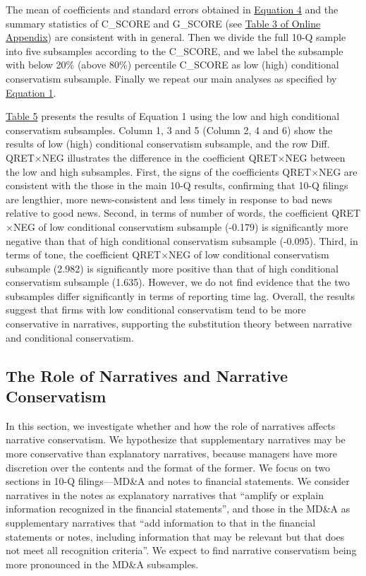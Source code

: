 \documentclass[a4paper]{article}
\begin{document}
\begin{spacing}{2}
The mean of coefficients and standard errors obtained in \hyperref[eq4]{Equation 4} and the summary statistics of C\_SCORE and G\_SCORE (see \hyperref[oat3]{Table 3 of Online Appendix}) are consistent with  in general. Then we divide the full 10-Q sample into five subsamples according to the C\_SCORE, and we label the subsample with below 20\% (above 80\%) percentile C\_SCORE as low (high) conditional conservatism subsample. Finally we repeat our main analyses as specified by \hyperref[eq1]{Equation 1}.

\hyperref[T5]{Table 5} presents the results of Equation 1 using the low and high conditional conservatism subsamples. Column 1, 3 and 5 (Column 2, 4 and 6) show the results of low (high) conditional conservatism subsample, and the row Diff. QRET$\times$NEG illustrates the difference in the coefficient QRET$\times$NEG between the low and high subsamples. First, the signs of the coefficients QRET$\times$NEG are consistent with the those in the main 10-Q results, confirming that 10-Q filings are lengthier, more news-consistent and less timely in response to bad news relative to good news. Second, in terms of number of words, the coefficient QRET$\times$NEG of low conditional conservatism subsample (-0.179) is significantly more negative than that of high conditional conservatism subsample (-0.095). Third, in terms of tone, the coefficient QRET$\times$NEG of low conditional conservatism subsample (2.982) is significantly more positive than that of high conditional conservatism subsample (1.635). However, we do not find evidence that the two subsamples differ significantly in terms of reporting time lag. Overall, the results suggest that firms with low conditional conservatism tend to be more conservative in narratives, supporting the substitution theory between narrative and conditional conservatism.

\subsection{The Role of Narratives and Narrative Conservatism}
In this section, we investigate whether and how the role of narratives affects narrative conservatism. We hypothesize that supplementary narratives may be more conservative than explanatory narratives, because managers have more discretion over the contents and the format of the former. We focus on two sections in 10-Q filings---MD\&A and notes to financial statements. We consider narratives in the notes as explanatory narratives that ``amplify or explain information recognized in the financial statements'', and those in the MD\&A as supplementary narratives that ``add information to that in the financial statements or notes, including information that may be relevant but that does not meet all recognition criteria''\cite[CON5-7]{fasbStatementFinancialAccounting1984}. We expect to find narrative conservatism being more pronounced in the MD\&A subsamples. 


\end{spacing}
\end{document}
